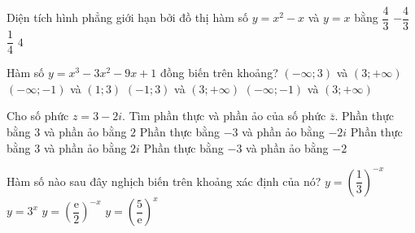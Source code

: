 \begin{ex}%
	Diện tích hình phẳng giới hạn bởi đồ thị hàm số $y=x^2-x$ và $y=x$ bằng
	\choice
	{\True $\dfrac{4}{3}$}
	{$-\dfrac{4}{3}$}
	{$\dfrac{1}{4}$}
	{$4$}
\end{ex}

\begin{ex}%
	Hàm số $y=x^3-3x^2-9x+1$ đồng biến trên khoảng?
	\choice
	{$(-\infty;3)$ và $(3;+\infty)$}
	{$(-\infty;-1)$ và $(1;3)$}
	{$(-1;3)$ và $(3;+\infty)$}
	{\True $(-\infty;-1)$ và $(3;+\infty)$}
\end{ex}

\begin{ex}%
	Cho số phức $z=3-2i$. Tìm phần thực và phần ảo của số phức $\overline{z}$.
	\choice
	{\True Phần thực bằng $3$ và phần ảo bằng $2$}
	{Phần thực bằng $-3$ và phần ảo bằng $-2i$}
	{Phần thực bằng $3$ và phần ảo bằng $2i$}
	{Phần thực bằng $-3$ và phần ảo bằng $-2$}
\end{ex}

\begin{ex}%
	Hàm số nào sau đây nghịch biến trên khoảng xác định của nó?
	\choice
	{$y=\left(\dfrac{1}{3}\right)^{-x}$}
	{$y=3^x$}
	{\True $y=\left(\dfrac{\mathrm{e}}{2}\right)^{-x}$}
	{$y=\left(\dfrac{5}{\mathrm{e}}\right)^x$}
\end{ex}

